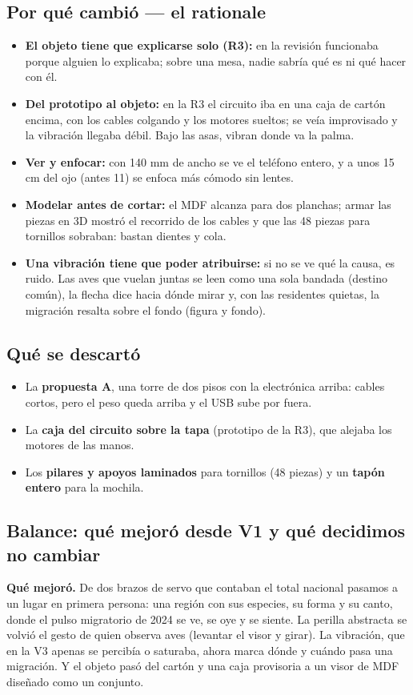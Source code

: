 \documentclass[11pt,a4paper]{article}
\begin{document}
\subsection*{Por qué cambió --- el rationale}
\begin{itemize}
\item \textbf{El objeto tiene que explicarse solo (R3):} en la revisión funcionaba porque alguien lo explicaba; sobre una mesa, nadie sabría qué es ni qué hacer con él.
\item \textbf{Del prototipo al objeto:} en la R3 el circuito iba en una caja de cartón encima, con los cables colgando y los motores sueltos; se veía improvisado y la vibración llegaba débil. Bajo las asas, vibran donde va la palma.
\item \textbf{Ver y enfocar:} con 140 mm de ancho se ve el teléfono entero, y a unos 15 cm del ojo (antes 11) se enfoca más cómodo sin lentes.
\item \textbf{Modelar antes de cortar:} el MDF alcanza para dos planchas; armar las piezas en 3D mostró el recorrido de los cables y que las 48 piezas para tornillos sobraban: bastan dientes y cola.
\item \textbf{Una vibración tiene que poder atribuirse:} si no se ve qué la causa, es ruido. Las aves que vuelan juntas se leen como una sola bandada (destino común), la flecha dice hacia dónde mirar y, con las residentes quietas, la migración resalta sobre el fondo (figura y fondo).
\end{itemize}
\subsection*{Qué se descartó}
\begin{itemize}
\item La \textbf{propuesta A}, una torre de dos pisos con la electrónica arriba: cables cortos, pero el peso queda arriba y el USB sube por fuera.
\item La \textbf{caja del circuito sobre la tapa} (prototipo de la R3), que alejaba los motores de las manos.
\item Los \textbf{pilares y apoyos laminados} para tornillos (48 piezas) y un \textbf{tapón entero} para la mochila.
\end{itemize}
\subsection*{Balance: qué mejoró desde V1 y qué decidimos no cambiar}
\textbf{Qué mejoró.} De dos brazos de servo que contaban el total nacional pasamos a un lugar en primera persona: una región con sus especies, su forma y su canto, donde el pulso migratorio de 2024 se ve, se oye y se siente. La perilla abstracta se volvió el gesto de quien observa aves (levantar el visor y girar). La vibración, que en la V3 apenas se percibía o saturaba, ahora marca dónde y cuándo pasa una migración. Y el objeto pasó del cartón y una caja provisoria a un visor de MDF diseñado como un conjunto.
\end{document}
